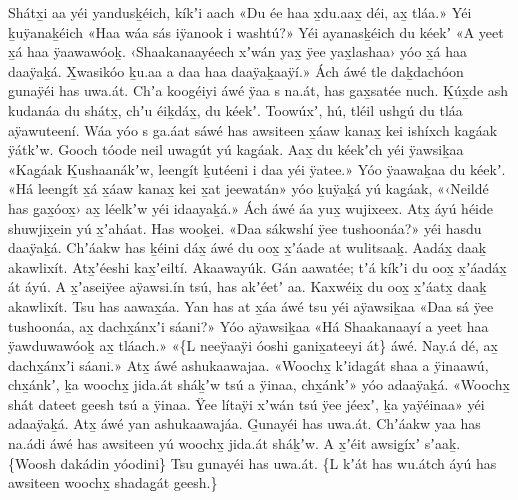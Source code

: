 \begin{pairs}
\begin{Leftside}
Shát\-x̱i aa yéi yandusḵéich, kíkʼi aach
«\!Du ée haa x̱du.aax̱ déi, ax̱ tláa.\!»
Yéi ḵuÿanaḵéich
«\!Haa wáa sás iÿanook i washtú?\!»
Yéi ayanasḵéich du kéekʼ
«\!A yeet x̱á haa ÿaawa\-wóoḵ.
‹\!Shaakanaayéech xʼwán yax̱ ÿee yax̱\-lashaa\!›
yóo x̱á haa daaÿaḵá.
X̱wasikóo ḵu.aa a daa haa daaÿaḵaaÿí.\!»
\pend
\pstart
{}Ách áwé tle daḵdachóon g̱unaÿéi has uwa.át.
Chʼa koogéiyi áwé ÿaa s na.át, has gax̱satée nuch.
Ḵúx̱de ash kudanáa du shátx̱, chʼu éiḵdáx̱, du kéekʼ.
Toowúxʼ, hú, tléil ushgú du tláa aÿawuteení.
Wáa yóo s ga.áat sáwé has awsiteen x̱áaw kanax̱ kei ishíxch kag̱áak ÿátkʼw.
Gooch tóode neil uwagút yú kag̱áak.
Aax̱ du kéekʼch yéi ÿawsiḵaa
«\!Kag̱áak Ḵushaanákʼw, leengít ḵutéeni i daa yéi ÿatee.\!»
Yóo ÿaawaḵaa du kéekʼ.
«\!Há leengít x̱á x̱áaw kanax̱ kei x̱at jeewatán\!»
yóo ḵuÿaḵá yú kag̱áak,
«\!‹\!Neildé has g̱ax̱óox̱\!› ax̱ léelkʼw yéi idaayaḵá.\!»
Ách áwé áa yux̱ wujixeex.
Atx̱ áyú héide shuwji\-x̱ein yú x̱ʼaháat.
Has wooḵei.
«\!Daa sá\-kwshí ÿee tushoonáa?\!»
yéi hasdu daaÿaḵá.
Chʼáakw has ḵéini dáx̱ áwé du oox̱ x̱ʼáade at wulitsaaḵ.
Aadáx̱ daaḵ akawlixít.
Atx̱ʼée\-shi kax̱ʼeiltí.
Akaawayúk.
Gán aawatée;
tʼá kíkʼi du oox̱ x̱ʼáadáx̱ át áyú.
A x̱ʼasei\-ÿee aÿawsi.ín tsú, has akʼéetʼ aa.
Kaxwéix̱ du oox̱ x̱ʼáatx̱ daaḵ akawlixít.
Tsu has aawax̱áa.
Yan has at x̱áa áwé tsu yéi aÿawsiḵaa
«\!Daa sá ÿee tushoonáa, ax̱ dachx̱ánxʼi sáani?\!»\hspace*{-0.125ex}
\hspace{-0.125ex}Yóo aÿawsiḵaa
«\!Há Shaakanaayí a yeet haa ÿawduwawóoḵ ax̱ tláach.\!» 
«\!\{L neeÿaaÿi óoshi g̱anix̱ateeyi át\} áwé.
Nay.á dé, ax̱ dachx̱ánxʼi sáani.\!»
Atx̱ áwé ashukaawajaa.
«\!Woochx̱ kʼidag̱át shaa a ÿinaawú, chx̱ánkʼ,
ḵa woochx̱ jida.át sháḵʼw tsú a ÿinaa, chx̱ánkʼ\!»
yóo adaaÿaḵá.
«\!Woochx̱ shát dateet geesh tsú a ÿinaa.
Ÿee lítaÿi xʼwán tsú ÿee jéexʼ, ḵa yaÿéinaa\!»
yéi adaaÿaḵá.
Atx̱ áwé yan ashu\-kaawajáa.
G̱unayéi has uwa.át.
Chʼáakw yaa has na.ádi áwé has awsiteen yú woochx̱ ji\-da.át sháḵʼw.
A x̱ʼéit awsig̱íxʼ sʼaaḵ.
\{Woo\-sh dakádin yóodini\}
Tsu g̱unayéi has uwa\-.át.
\{L kʼát has wu.átch áyú has awsiteen woochx̱ shadag̱át geesh.\}

\end{Leftside}
\end{pairs}
